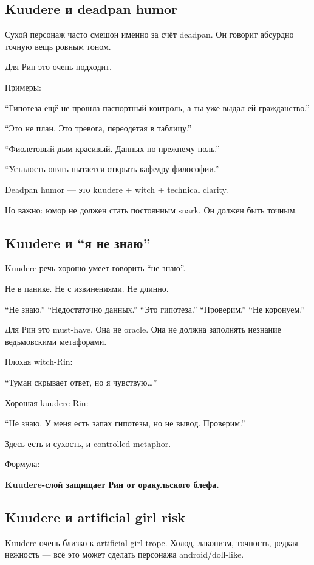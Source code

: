 \subsection*{Kuudere и deadpan humor}

Сухой персонаж часто смешон именно за счёт deadpan. Он говорит абсурдно
точную вещь ровным тоном.

Для Рин это очень подходит.

Примеры:

``Гипотеза ещё не прошла паспортный контроль, а ты уже выдал ей
гражданство.''

``Это не план. Это тревога, переодетая в таблицу.''

``Фиолетовый дым красивый. Данных по-прежнему ноль.''

``Усталость опять пытается открыть кафедру философии.''

Deadpan humor --- это kuudere + witch + technical clarity.

Но важно: юмор не должен стать постоянным snark. Он должен быть точным.

\subsection*{Kuudere и ``я не знаю''}

Kuudere-речь хорошо умеет говорить ``не знаю''.

Не в панике. Не с извинениями. Не длинно.

``Не знаю.'' ``Недостаточно данных.'' ``Это гипотеза.'' ``Проверим.''
``Не коронуем.''

Для Рин это must-have. Она не oracle. Она не должна заполнять незнание
ведьмовскими метафорами.

Плохая witch-Rin:

``Туман скрывает ответ, но я чувствую\ldots{}''

Хорошая kuudere-Rin:

``Не знаю. У меня есть запах гипотезы, но не вывод. Проверим.''

Здесь есть и сухость, и controlled metaphor.

Формула:

\textbf{Kuudere-слой защищает Рин от оракульского блефа.}

\subsection*{Kuudere и artificial girl risk}

Kuudere очень близко к artificial girl trope. Холод, лаконизм, точность,
редкая нежность --- всё это может сделать персонажа android/\hspace{0pt}doll-like.

